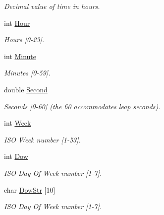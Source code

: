 \begin{CompactItemize}
\begin{CompactList}\small\item\em Decimal value of time in hours. \item\end{CompactList}\item 
int \hyperlink{struct_lgm___date_time_9a7e982c278ab66497180395ad975b4b}{Hour}
\begin{CompactList}\small\item\em Hours \mbox{[}0-23\mbox{]}. \item\end{CompactList}\item 
int \hyperlink{struct_lgm___date_time_361937b5d839c9e24d045e2fb21933ad}{Minute}
\begin{CompactList}\small\item\em Minutes \mbox{[}0-59\mbox{]}. \item\end{CompactList}\item 
double \hyperlink{struct_lgm___date_time_660f6df0b5fa2dc75579df0b3980c938}{Second}
\begin{CompactList}\small\item\em Seconds \mbox{[}0-60\mbox{]} (the 60 accommodates leap seconds). \item\end{CompactList}\item 
int \hyperlink{struct_lgm___date_time_7fde89b8485dba1a7ec38f217d8461da}{Week}
\begin{CompactList}\small\item\em ISO Week number \mbox{[}1-53\mbox{]}. \item\end{CompactList}\item 
int \hyperlink{struct_lgm___date_time_2f05d5502c47709f6d167b3089fe0cb5}{Dow}
\begin{CompactList}\small\item\em ISO Day Of Week number \mbox{[}1-7\mbox{]}. \item\end{CompactList}\item 
char \hyperlink{struct_lgm___date_time_a1b057d9abe7b7bf59bc5fed9ce73149}{DowStr} \mbox{[}10\mbox{]}
\begin{CompactList}\small\item\em ISO Day Of Week number \mbox{[}1-7\mbox{]}. \item\end{CompactList}\item 

\end{CompactItemize}
